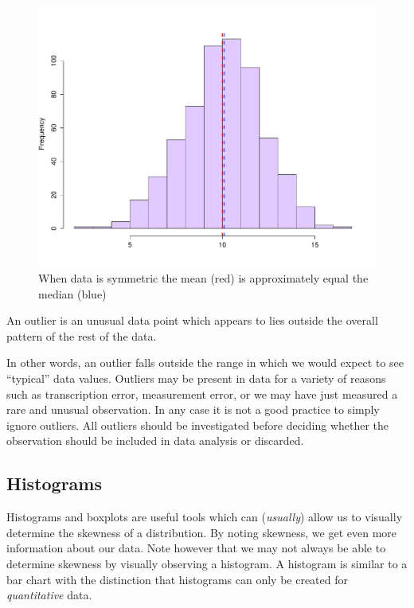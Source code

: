 \begin{figure}[H]
\begin{center}
	\includegraphics[scale=0.35]{Section2/symm.pdf}	
\caption{When data is symmetric the mean (red) is approximately equal the median (blue) }
\end{center}
\end{figure}

\begin{definition}[Outlier]	
An outlier is an unusual data point which appears to lies outside the overall pattern of the rest of the data.
\end{definition}

In other words, an outlier falls outside the range in which we would expect to see ``typical'' data values. Outliers may be present in data for a variety of reasons such as transcription error, measurement error, or we may have just measured a rare and unusual observation. In any case it is not a good practice to simply ignore outliers. All outliers should be investigated before deciding whether the observation should be included in data analysis or discarded.



\subsection{Histograms}	
Histograms and boxplots are useful tools which can (\textit{usually}) allow us to visually determine the skewness of a distribution. By noting skewness, we get even more information about our data. Note however that we may not always be able to determine skewness by visually observing a histogram. A histogram is similar to a bar chart with the distinction that histograms can only be created for \textit{quantitative} data.\\ 

